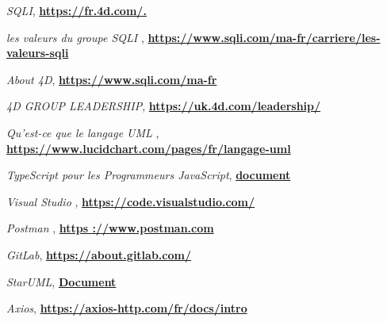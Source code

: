 
\renewcommand{\bibname}{Références}

\begin{thebibliography}{99}
    \emph{SQLI},
    \href{}{\textbf{https://fr.4d.com/.}}
    
    \emph{les valeurs du groupe SQLI },
    \href{https://www.sqli.com/ma-fr/carriere/les-valeurs-sqli}{\textbf{https://www.sqli.com/ma-fr/carriere/les-valeurs-sqli}}
    
    \emph{About 4D},
    \href{https://www.sqli.com/ma-fr}{\textbf{https://www.sqli.com/ma-fr}}
    
    \emph{4D GROUP LEADERSHIP},
    \href{https://uk.4d.com/leadership/}{\textbf{https://uk.4d.com/leadership/}}
    
  
     \emph{Qu'est-ce que le langage UML },
     \href{https://www.lucidchart.com/pages/fr/langage-uml}{\textbf{https://www.lucidchart.com/pages/fr/langage-uml}}
     
     \emph{TypeScript pour les Programmeurs JavaScript},
     \href{https://www.typescriptlang.org/fr/docs/handbook/typescript-in-5-minutes.html}{\textbf{document}}
     
     \emph{Visual Studio },
     \href{https://code.visualstudio.com/}{\textbf{https://code.visualstudio.com/}}
     
     \emph{Postman },
     \href{https ://www.postman.com}{\textbf{https ://www.postman.com}}
     
     \emph{GitLab},
     \href{https://about.gitlab.com/}{\textbf{https://about.gitlab.com/}}
     
     \emph{StarUML},
     \href{https://inf1410.teluq.ca/teluqDownload.php?file=2014/01/INF1410-PresentationStarUML.pdf}{\textbf{Document}}
     

     \emph{Axios},
     \href{https://axios-http.com/fr/docs/intro}{\textbf{https://axios-http.com/fr/docs/intro}}
     
    \end{thebibliography}